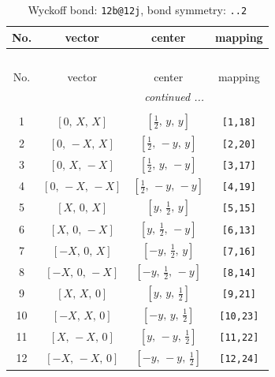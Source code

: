\documentclass[fleqn,8pt]{jsarticle}
\begin{document}
\renewcommand{\arraystretch}{1.2}
\begin{longtable}{cccc}
\caption{Wyckoff bond: {\tt 12b@12j}, bond symmetry: {\tt ..2}}
 \\
 \hline \hline
No. & vector & center & mapping \\ \hline \endfirsthead

\multicolumn{3}{l}{\tablename\ \thetable{}} \\
 \hline \hline
No. & vector & center & mapping \\ \hline \endhead

 \hline \hline
\multicolumn{3}{r}{\footnotesize\it continued ...} \\ \endfoot

 \hline \hline
\multicolumn{3}{r}{} \\ \endlastfoot

1 & $\left[ 0,\, X,\, X \right]$ & $\left[ \frac{1}{2},\, y,\, y \right]$ & {\tt [1,18]} \\ \hline
2 & $\left[ 0,\, - X,\, X \right]$ & $\left[ \frac{1}{2},\, - y,\, y \right]$ & {\tt [2,20]} \\ \hline
3 & $\left[ 0,\, X,\, - X \right]$ & $\left[ \frac{1}{2},\, y,\, - y \right]$ & {\tt [3,17]} \\ \hline
4 & $\left[ 0,\, - X,\, - X \right]$ & $\left[ \frac{1}{2},\, - y,\, - y \right]$ & {\tt [4,19]} \\ \hline
5 & $\left[ X,\, 0,\, X \right]$ & $\left[ y,\, \frac{1}{2},\, y \right]$ & {\tt [5,15]} \\ \hline
6 & $\left[ X,\, 0,\, - X \right]$ & $\left[ y,\, \frac{1}{2},\, - y \right]$ & {\tt [6,13]} \\ \hline
7 & $\left[ - X,\, 0,\, X \right]$ & $\left[ - y,\, \frac{1}{2},\, y \right]$ & {\tt [7,16]} \\ \hline
8 & $\left[ - X,\, 0,\, - X \right]$ & $\left[ - y,\, \frac{1}{2},\, - y \right]$ & {\tt [8,14]} \\ \hline
9 & $\left[ X,\, X,\, 0 \right]$ & $\left[ y,\, y,\, \frac{1}{2} \right]$ & {\tt [9,21]} \\ \hline
10 & $\left[ - X,\, X,\, 0 \right]$ & $\left[ - y,\, y,\, \frac{1}{2} \right]$ & {\tt [10,23]} \\ \hline
11 & $\left[ X,\, - X,\, 0 \right]$ & $\left[ y,\, - y,\, \frac{1}{2} \right]$ & {\tt [11,22]} \\ \hline
12 & $\left[ - X,\, - X,\, 0 \right]$ & $\left[ - y,\, - y,\, \frac{1}{2} \right]$ & {\tt [12,24]} \\
\end{longtable}
\end{document}
